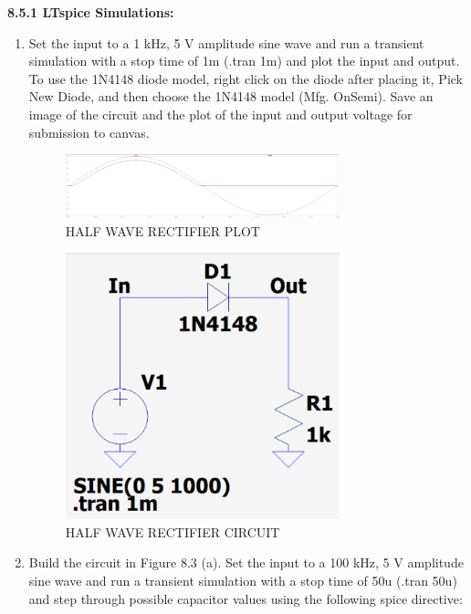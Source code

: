 \documentclass{article}
\begin{document}
\textbf{8.5.1 LTspice Simulations:}
\begin{enumerate}
    \item Set the input to a 1 kHz, 5 V amplitude
sine wave and run a transient simulation with a stop time of 1m (.tran 1m)
and plot the input and output. To use the 1N4148 diode model, right click on
the diode after placing it, Pick New Diode, and then choose the 1N4148 model
(Mfg. OnSemi). Save an image of the circuit and the plot of the input and
output voltage for submission to canvas.
    \begin{figure}[H]
        \centering
        \includegraphics[width=0.75\textwidth]{fig8_2_a.png}
        \caption{HALF WAVE RECTIFIER PLOT} 
        \label{fig:half_wave_rectifier}
    \end{figure}
    \begin{figure}[H]
        \centering
        \includegraphics[width=0.75\textwidth]{circuit8_2_a.png}
        \caption{HALF WAVE RECTIFIER CIRCUIT} 
        \label{fig:half_wave_rectifier_circuit}
    \end{figure}
    \item Build the circuit in Figure 8.3 (a). Set the input to a 100 kHz, 5 V amplitude
sine wave and run a transient simulation with a stop time of 50u (.tran 50u)
and step through possible capacitor values using the following spice directive:
    \begin{figure}[H]

\end{figure}
\end{enumerate}
\end{document}
